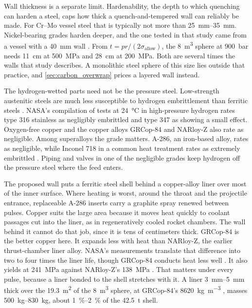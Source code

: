 \documentclass{article}
\begin{document}
Wall thickness is a separate limit. Hardenability, the depth to which quenching can harden a steel, caps how thick a quench-and-tempered wall can reliably be made. For Cr--Mo vessel steel that is typically not more than \SIrange{25}{35}{\milli\meter}. Nickel-bearing grades harden deeper, and the one tested in that study came from a vessel with a \SI{40}{\milli\meter} wall \cite{sanmarchi2017_thickwall}. From $t=pr/(2\sigma_{\mathrm{allow}})$, the \SI{8}{\cubic\meter} sphere at \SI{900}{\bar} needs \SI{11}{\centi\meter} at \SI{500}{\mega\pascal} and \SI{28}{\centi\meter} at \SI{200}{\mega\pascal}. Both are several times the walls that study describes. A monolithic steel sphere of this size lies outside that practice, and \autoref{sec:carbon_overwrap} prices a layered wall instead.

The hydrogen-wetted parts need not be the pressure steel. Low-strength austenitic steels are much less susceptible to hydrogen embrittlement than ferritic steels \cite{lee2016_nasa_hydrogen_embrittlement}. NASA's compilation of tests at \SI{24}{\celsius} in high-pressure hydrogen rates type 316 stainless as negligibly embrittled and type 347 as showing a small effect. Oxygen-free copper and the copper alloys GRCop-84 and NARloy-Z also rate as negligible. Among superalloys the grade matters. A-286, an iron-based alloy, rates as negligible, while Inconel 718 in a common heat treatment rates as extremely embrittled \cite{lee2016_nasa_hydrogen_embrittlement}. Piping and valves in one of the negligible grades keep hydrogen off the pressure steel where the feed enters.

The proposed wall puts a ferritic steel shell behind a copper-alloy liner over most of the inner surface. Where heating is worst, around the throat and the projectile entrance, replaceable A-286 inserts carry a graphite spray renewed between pulses. Copper suits the large area because it moves heat quickly to coolant passages cut into the liner, as in regeneratively cooled rocket chambers. The wall behind it cannot do that job, since it is tens of centimeters thick. GRCop-84 is the better copper here. It expands less with heat than NARloy-Z, the earlier thrust-chamber liner alloy. NASA's measurements translate that difference into two to four times the liner life, though GRCop-84 conducts heat less well \cite{ellis2000_grcop84_thermophysical}. It also yields at \SI{241}{\mega\pascal} against NARloy-Z's \SI{138}{\mega\pascal} \cite{lee2016_nasa_hydrogen_embrittlement}. That matters under every pulse, because a liner bonded to the shell stretches with it. A liner \SIrange{3}{5}{\milli\meter} thick over the \SI{19.3}{\square\meter} of the \SI{8}{\cubic\meter} sphere, at GRCop-84's \SI{8620}{\kilogram\per\cubic\meter} \cite{ellis2002_grcop84_handbook}, masses \SIrange{500}{830}{\kilogram}, about \SIrange{1}{2}{\percent} of the \SI{42.5}{\tonne} shell.
\end{document}

